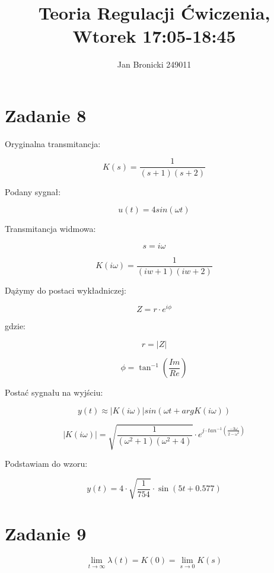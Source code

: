 \documentclass{article}
\title{Teoria Regulacji Ćwiczenia, Wtorek 17:05-18:45}
\author{Jan Bronicki 249011 }
\date{}
\begin{document}
\maketitle

\section*{Zadanie 8}

Oryginalna transmitancja:

$$ K(s) = \frac{1}{\left(s + 1\right) \left(s + 2\right)} $$

Podany sygnał:

$$ u(t) = 4sin(\omega t) $$

Transmitancja widmowa:

$$ s = i\omega $$

$$K(i\omega) = \frac{1}{\left(i w + 1\right) \left(i w + 2\right)}$$

Dążymy do postaci wykładniczej:

$$ Z=r\cdot e^{i\phi} $$

gdzie:

$$ r = |Z| $$

$$ \phi = \tan^{-1}\left(\frac{Im}{Re}\right) $$

Postać sygnału na wyjściu:

$$y(t)\approx\left|K(i\omega)\right|sin\left(\omega t + argK(i \omega)\right)$$



$$ \left|K(i\omega)\right| = \sqrt{\frac{1}{(\omega^{2}+1)(\omega^{2}+4)}}\cdot e^{j\cdot 
tan^{-1}\left(\frac{-3\omega}{2-\omega^{2}}\right)} $$

Podstawiam do wzoru:

$$y(t)=4\cdot \sqrt{\frac{1}{754}}\cdot \sin\left(5t+0.577\right)$$












\newpage

\section*{Zadanie 9}

$$ \lim\limits_{t \to \infty} \lambda(t) = K(0) = \lim\limits_{s \to 0} K(s)  $$
\end{document}
